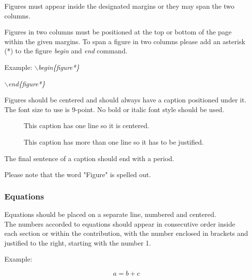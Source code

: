 \documentclass[a4paper,twoside]{article}
\begin{document}
Figures must appear inside the designated margins or they may span
the two columns.

Figures in two columns must be positioned at the top or bottom of
the page within the given margins. To span a figure in two columns please add an asterisk (*) to the figure \textit{begin} and \textit{end} command.

Example: \textit{$\backslash$begin\{figure*\}}

\hspace*{1.5cm}\textit{$\backslash$end\{figure*\}}

Figures should be centered and should always have a caption
positioned under it. The font size to use is 9-point. No bold or
italic font style should be used.

\begin{figure}[!h]
  \centering
   {}
  \caption{This caption has one line so it is centered.}
  \label{fig:example1}
 \end{figure}

\begin{figure}[!h]
  \vspace{-0.2cm}
  \centering
   {}
  \caption{This caption has more than one line so it has to be justified.}
  \label{fig:example2}
  \vspace{-0.1cm}
\end{figure}

The final sentence of a caption should end with a period.



Please note that the word "Figure" is spelled out.

\subsubsection{Equations}

Equations should be placed on a separate line, numbered and
centered.\\The numbers accorded to equations should appear in
consecutive order inside each section or within the contribution,
with the number enclosed in brackets and justified to the right,
starting with the number 1.

Example:

\begin{equation}\label{eq1}
    a=b+c
\end{equation}
\end{document}
